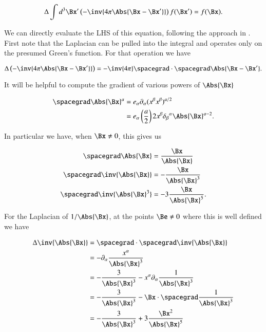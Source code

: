 \begin{equation}\label{eqn:relativisticElectrodynamicsL18:133}
\Delta \int d^3 \Bx' \left(-\inv{4 \pi \Abs{\Bx - \Bx'} } \right) f(\Bx') = f(\Bx).
\end{equation}

We can directly evaluate the LHS of this equation, following the approach in \cite{schwartz1987pe}.  First note that the Laplacian can be pulled into the integral and operates only on the presumed Green's function.  For that operation we have

\begin{equation}\label{eqn:relativisticElectrodynamicsL18:134}
\Delta \left(-\inv{4 \pi \Abs{\Bx - \Bx'} } \right)
=
-\inv{4 \pi} \spacegrad \cdot \spacegrad \Abs{\Bx - \Bx'}.
\end{equation}

It will be helpful to compute the gradient of various powers of $\Abs{\Bx}$

\begin{align*}
\spacegrad \Abs{\Bx}^a
&=
e_\alpha \partial_\alpha (x^\beta x^\beta)^{a/2} \\
&=
e_\alpha \left(\frac{a}{2}\right) 2 x^\beta {\delta_\beta}^\alpha \Abs{\Bx}^{a - 2}.
\end{align*}

In particular we have, when $\Bx \ne 0$, this gives us

\begin{align}\label{eqn:relativisticElectrodynamicsL18:135}
\spacegrad \Abs{\Bx} &= \frac{\Bx}{\Abs{\Bx}} \\
\spacegrad \inv{\Abs{\Bx}} &= -\frac{\Bx}{\Abs{\Bx}^3} \\
\spacegrad \inv{\Abs{\Bx}^3} &= -3 \frac{\Bx}{\Abs{\Bx}^5}.
\end{align}

For the Laplacian of $1/\Abs{\Bx}$, at the points $\Be \ne 0$ where this is well defined we have

\begin{align*}
\Delta \inv{\Abs{\Bx}} 
&=
\spacegrad \cdot \spacegrad \inv{\Abs{\Bx}} \\
&= 
-\partial_\alpha \frac{x^\alpha}{\Abs{\Bx}^3} \\
&= 
-\frac{3}{\Abs{\Bx}^3} 
- x^\alpha \partial_\alpha \frac{1}{\Abs{\Bx}^3} \\
&= 
-\frac{3}{\Abs{\Bx}^3} 
- \Bx \cdot \spacegrad \frac{1}{\Abs{\Bx}^3} \\
&= 
-\frac{3}{\Abs{\Bx}^3} 
+ 3 \frac{\Bx^2}{\Abs{\Bx}^5}
\end{align*}

